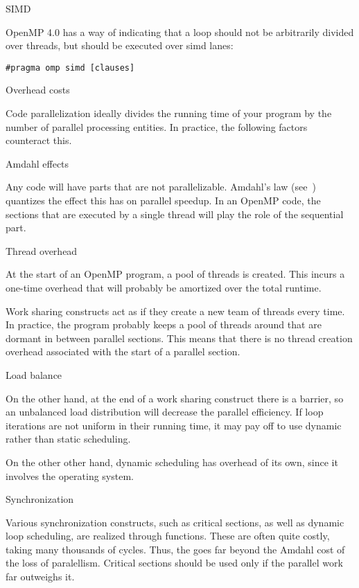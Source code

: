  {SIMD}

OpenMP 4.0 has a way of indicating that a loop should not
be arbitrarily divided over threads, but should be executed
over simd lanes:
\begin{verbatim}
#pragma omp simd [clauses]
\end{verbatim}

 {Overhead costs}

Code parallelization ideally divides the running time of your program
by the number of parallel processing entities. In practice, the following
factors counteract this.

 {Amdahl effects}

Any code will have parts that are not parallelizable. Amdahl's law
(see~) quantizes the effect this has on parallel speedup.
In an OpenMP code, the sections that are executed by a single thread
will play the role of the sequential part.

 {Thread overhead}

At the start of an OpenMP program, a pool of threads is created. This
incurs a one-time overhead that will probably be amortized over the
total runtime.

Work sharing constructs act as if they create a new team of threads every time.
In practice, the program probably keeps a pool of threads around that are dormant
in between parallel sections. This means that there is no thread creation overhead
associated with the start of a parallel section.

 {Load balance}

On the other hand, at the end of a work sharing construct there is a barrier,
so an unbalanced load distribution will decrease the parallel efficiency.
If loop iterations are not uniform in their running time, it may pay off
to use dynamic rather than static scheduling.

On the other other hand, dynamic scheduling has overhead of its own,
since it involves the operating system.

 {Synchronization}

Various synchronization constructs, such as critical sections, as well as
dynamic loop scheduling, are realized through 
functions. These are often quite costly, taking many thousands of cycles.
Thus, the  goes far beyond
the Amdahl cost of the loss of paralellism. Critical sections should be used only
if the parallel work far outweighs it.

